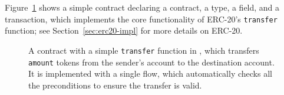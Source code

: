 \documentclass[dvipsnames, usenames, sigconf]{acmart}
\begin{document}
Figure~\ref{fig:erc20-transfer-flow} shows a simple contract declaring a contract, a type, a field, and a transaction, which implements the core functionality of ERC-20's \lstinline{transfer} function; see Section~\ref{sec:erc20-impl} for more details on ERC-20.
\begin{figure}[ht]
    \centering
    
    \caption{A contract with a simple \lstinline{transfer} function in \langName, which transfers \lstinline{amount} tokens from the sender's account to the destination account.
It is implemented with a single flow, which automatically checks all the preconditions to ensure the transfer is valid.}
    \label{fig:erc20-transfer-flow}
\end{figure}
%         
%         
\end{document}
